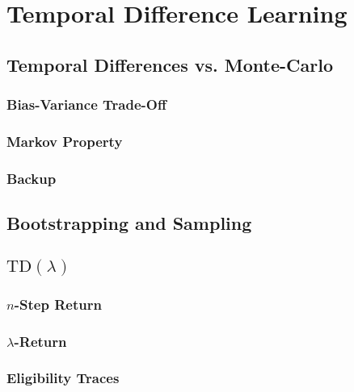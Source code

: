 \chapter{Temporal Difference Learning} %

	\section{Temporal Differences vs. Monte-Carlo} %

		\subsection{Bias-Variance Trade-Off} %

		\subsection{Markov Property} %

		\subsection{Backup} %

	\section{Bootstrapping and Sampling} %

	\section{\( \text{TD}(\lambda) \)} %

		\subsection{\(n\)-Step Return} %

		\subsection{\(\lambda\)-Return} %

		\subsection{Eligibility Traces} %

